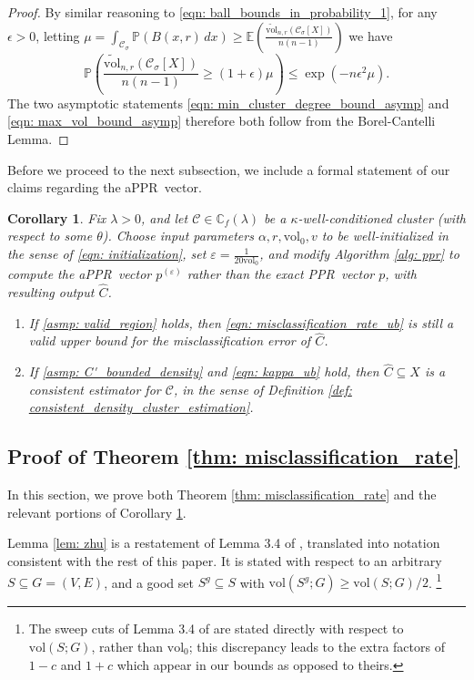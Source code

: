\documentclass[11pt,twoside]{article}
\newtheorem{corollary}{Corollary}
\newcommand{\vol}{\mathrm{vol}}
\newcommand{\1}{\mathbf{1}}
\newcommand{\pbf}{p}        %
\newcommand{\Xbf}{X}             %
\newcommand{\Pbb}{\mathbb{P}}
\newcommand{\Cbb}{\mathbb{C}}
\newcommand{\Ebb}{\mathbb{E}}
\newcommand{\Cset}{\mathcal{C}}
\newcommand{\Csig}{\Cset_{\sigma}}
\newcommand{\Cest}{\widehat{C}}
\newcommand{\dx}{\,dx}
\newcommand{\pprspace}{{\sc PPR~}}
\begin{document}
\begin{proof}
	By similar reasoning to \eqref{eqn: ball_bounds_in_probability_1}, for any $\epsilon > 0$, letting $\mu = \int_{\Csig} \Pbb(B(x,r) \dx) \geq \Ebb\left(\frac{\widetilde{\vol}_{n,r}(\Csig[\Xbf])}{n(n-1)}\right)$ we have
	\begin{equation*}
	\Pbb\left(\frac{\widetilde{\vol}_{n,r}(\Csig[\Xbf])}{n(n-1)} \geq (1 + \epsilon)\mu \right) \leq \exp(-n\epsilon^2\mu).
	\end{equation*}
	The two asymptotic statements \eqref{eqn: min_cluster_degree_bound_asymp} and \eqref{eqn: max_vol_bound_asymp} therefore both follow from the Borel-Cantelli Lemma.
\end{proof}

Before we proceed to the next subsection, we include a formal statement of our claims regarding the a\pprspace vector. 
\begin{corollary}
	\label{cor: appr}
	Fix $\lambda > 0$, and let $\Cset \in \Cbb_f(\lambda)$ be a $\kappa$-well-conditioned cluster (with respect to some $\theta$). Choose input parameters $\alpha, r, \vol_0, v$ to be well-initialized in the sense of \eqref{eqn: initialization}, set $\varepsilon = \frac{1}{20 \vol_0}$, and modify Algorithm \ref{alg: ppr} to compute the a\pprspace vector $\pbf^{(\varepsilon)}$ rather than the exact \pprspace vector $\pbf$, with resulting output $\Cest$.
	\begin{enumerate}
		\item If \ref{asmp: valid_region} holds, then \eqref{eqn: misclassification_rate_ub} is still a valid upper bound for the misclassification error of $\Cest$.
		\item If \ref{asmp: C'_bounded_density} and \eqref{eqn: kappa_ub} hold, 
		then $\Cest \subseteq \Xbf$ is a consistent estimator for $\Cset$, in the sense of Definition \ref{def: consistent_density_cluster_estimation}.
	\end{enumerate}
\end{corollary}

\subsection{Proof of Theorem \ref{thm: misclassification_rate}}
\label{sec: proof_of_misclassification_rate}

In this section, we prove both Theorem \ref{thm: misclassification_rate} and the relevant portions of Corollary \ref{cor: appr}.

Lemma \ref{lem: zhu} is a restatement of Lemma 3.4 of \cite{zhu2013}, translated into notation consistent with the rest of this paper. It is stated with respect to an arbitrary $S \subseteq G = (V,E)$, and a good set $S^g \subseteq S$ with $\vol(S^g; G) \geq \vol(S; G)/2$. \footnote{The sweep cuts of Lemma 3.4 of \cite{zhu2013} are stated directly with respect to $\vol(S;G)$, rather than $\vol_0$; this discrepancy leads to the extra factors of $1 - c$ and $1 + c$ which appear in our bounds as opposed to theirs.}
\end{document}
